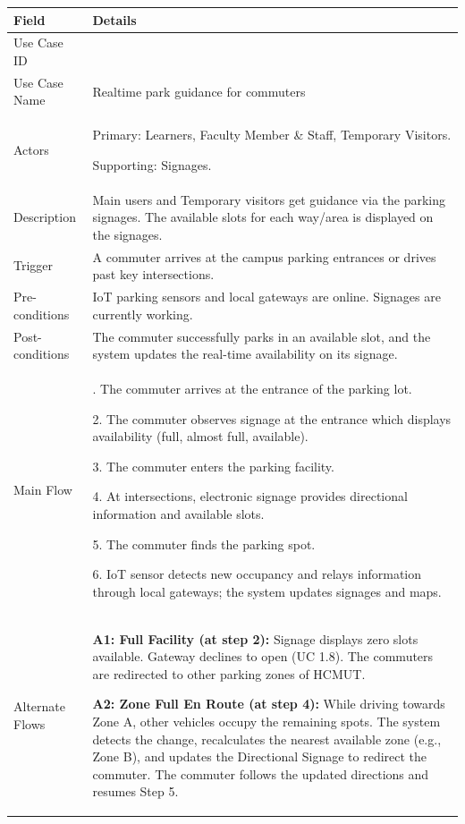 \begin{table}[H]
\small
\renewcommand{\arraystretch}{1.4}
\begin{tabularx}{\textwidth}{|>{\raggedright\arraybackslash}p{3.5cm}|>{\RaggedRight\arraybackslash}X|}
\hline
\rowcolor{gray!20} \textbf{Field} & \textbf{Details} \\
\hline
Use Case ID & 2.1 \\
\hline
Use Case Name & Realtime park guidance for commuters \\
\hline
Actors & Primary: Learners, Faculty Member \& Staff, Temporary Visitors. \par Supporting: Signages. \\
\hline
Description & Main users and Temporary visitors get guidance via the parking signages. The available slots for each way/area is displayed on the signages. \\
\hline
Trigger & A commuter arrives at the campus parking entrances or drives past key intersections. \\
\hline
Pre-conditions & IoT parking sensors and local gateways are online. Signages are currently working. \\
\hline
Post-conditions & The commuter successfully parks in an available slot, and the system updates the real-time availability on its signage. \\
\hline
Main Flow & 
1. The commuter arrives at the entrance of the parking lot. \par
2. The commuter observes signage at the entrance which displays availability (full, almost full, available). \par
3. The commuter enters the parking facility. \par
4. At intersections, electronic signage provides directional information and available slots. \par
5. The commuter finds the parking spot. \par
6. IoT sensor detects new occupancy and relays information through local gateways; the system updates signages and maps. \\
\hline
Alternate Flows & 
\textbf{A1: Full Facility (at step 2):} Signage displays zero slots available. Gateway declines to open (UC 1.8). The commuters are redirected to other parking zones of HCMUT. \par \vspace{0.5em}
\textbf{A2: Zone Full En Route (at step 4):} While driving towards Zone A, other vehicles occupy the remaining spots. The system detects the change, recalculates the nearest available zone (e.g., Zone B), and updates the Directional Signage to redirect the commuter. The commuter follows the updated directions and resumes Step 5. \\

\end{tabularx}
\end{table}
